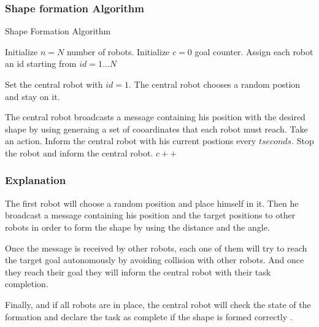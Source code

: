 \documentclass[12pt]{extarticle}
\begin{document}
\subsubsection{Shape formation Algorithm}


\begin{algorithm}[H]
\caption{Shape Formation Algorithm}
\label{alg:ddpg}
\begin{algorithmic}[1]

\State Initialize $n=N$ number of robots.
\State Initialize $c=0$ goal counter.
\State Assign each robot an id starting from $id=1...N$

\State Set the central robot with $id=1$.
\State The central robot  chooses a random postion and stay on it.

\State The central robot broadcasts a message containing his position with the desired shape by using generaing a set of cooardinates that each robot must reach.
\State Take an action.
\State Inform the central robot with his current postions every $t seconds$.
    \State Stop the robot and inform the central robot.
    \State $c++$ 

\EndIf 

\EndFor

\EndWhile

\end{algorithmic}
\end{algorithm}

\subsubsection{Explanation}

The first robot will choose a random position and place himself in it. Then he broadcast a message containing his position and the target positions to other robots in order to form the shape by using the distance and the angle.

Once the message is received by other robots, each one of them will try to reach the target goal autonomously by avoiding collision with other robots.
And once they reach their goal they will inform the central robot with their task completion.

Finally, and if all robots are in place, the central robot will check  the state of the formation and declare the task  as complete if  the shape is formed correctly .
\end{document}
